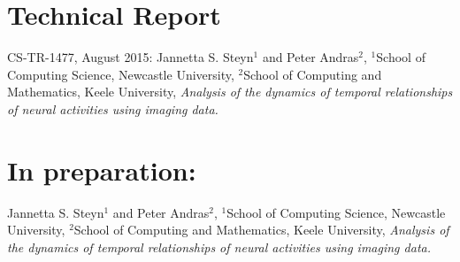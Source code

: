 \section{Technical Report}
 CS-TR-1477, August 2015: Jannetta S. Steyn$^{1}$ and Peter Andras$^{2}$, $^{1}$School of Computing Science, Newcastle University, $^{2}$School of Computing and Mathematics, Keele University, \textit{Analysis of the dynamics of temporal relationships of neural activities using imaging data.}

\section{In preparation:}
Jannetta S. Steyn$^{1}$ and Peter Andras$^{2}$, $^{1}$School of Computing Science, Newcastle University, $^{2}$School of Computing and Mathematics, Keele University, \textit{Analysis of the dynamics of temporal relationships of neural activities using imaging data.}

